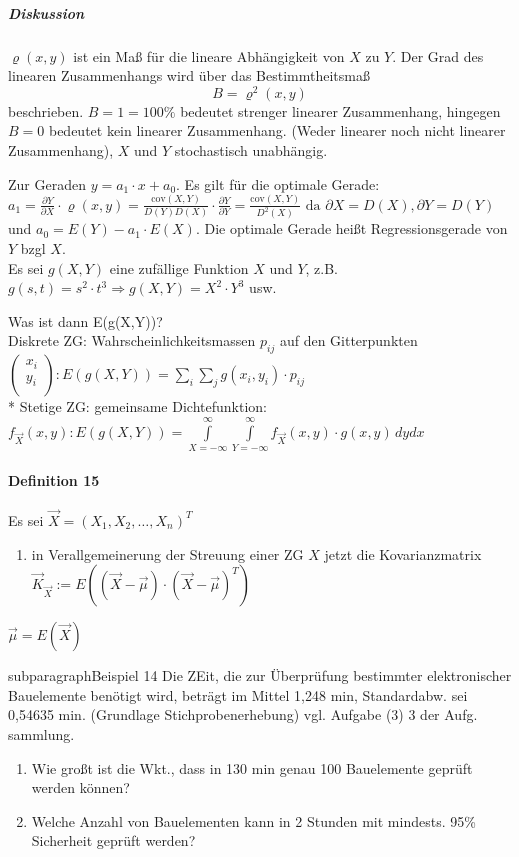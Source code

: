\documentclass[a4paper]{scrartcl}
\begin{document}
\subparagraph{Diskussion} $\varrho (x,y)$ ist ein Maß für die lineare Abhängigkeit von $X$ zu $Y$. Der Grad des linearen Zusammenhangs wird über das Bestimmtheitsmaß \[B= \varrho^2 (x,y)\] beschrieben. $B=1 = 100 \%$ bedeutet strenger linearer Zusammenhang, hingegen $B=0$ bedeutet kein linearer Zusammenhang. (Weder linearer noch nicht linearer Zusammenhang), $X$ und $Y$ stochastisch unabhängig.

Zur Geraden $y=a_1 \cdot x + a_0$. Es gilt für die optimale Gerade:
$a_1 = \frac{\partial Y}{\partial X} \cdot \varrho (x,y) = \frac{\text{cov} (X,Y)}{D(Y) D(X)} \cdot \frac{\partial Y}{\partial Y} = \frac{\text{cov} (X,Y)}{D^2 (X)} \text{ da } \partial X = D(X), \partial Y = D(Y)$ und $a_0 = E(Y) - a_1 \cdot E(X)$.
Die optimale Gerade heißt Regressionsgerade von $Y$ bzgl $X$.\\
Es sei $g(X,Y)$ eine zufällige Funktion $X$ und $Y$, z.B. $g(s,t) = s^2 \cdot t^3 \Rightarrow g(X,Y) = X^2 \cdot Y^3$ usw.

Was ist dann E(g(X,Y))?\\
Diskrete ZG: Wahrscheinlichkeitsmassen $p_{ij}$ auf den Gitterpunkten $\begin{pmatrix} x_i \\ y_i \\ \end{pmatrix} : E(g(X,Y)) = \sum\limits_i \sum\limits_j g(x_i,y_i) \cdot p_{ij}$\\*
Stetige ZG: gemeinsame Dichtefunktion: $f_{\vec{X}} (x,y) : E(g(X,Y)) = \int\limits_{X=-\infty}^{\infty} \int\limits_{Y= - \infty}^{\infty} f_{\vec{X}} (x,y) \cdot g(x,y) \, dy dx$

\paragraph{Definition 15} Es sei $\vec{X} = (X_1,X_2,\dots,X_n)^T$

\begin{enumerate}

\item in Verallgemeinerung der Streuung einer ZG $X$ jetzt die Kovarianzmatrix $\vec{K}_{\vec{X}} := E((\vec{X} - \vec{\mu} ) \cdot ( \vec{X} - \vec{\mu})^T)$
\end{enumerate}

$\vec{\mu} = E(\vec{X})$


subparagraph{Beispiel 14} Die ZEit, die zur Überprüfung bestimmter elektronischer Bauelemente benötigt wird, beträgt im Mittel 1,248 min, Standardabw. sei 0,54635 min. (Grundlage Stichprobenerhebung) vgl. Aufgabe (3) 3 der Aufg.  sammlung.
\begin{enumerate}
\item Wie großt ist die Wkt., dass in 130 min genau 100 Bauelemente geprüft werden können?
\item Welche Anzahl von Bauelementen kann in 2 Stunden mit mindests. 95\% Sicherheit geprüft werden?
\end{enumerate}
\end{document}
